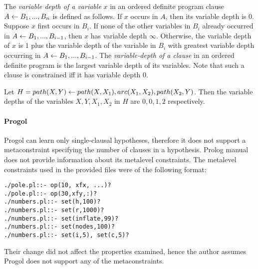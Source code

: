 \begin{defn}\label{definition_variable_depth}\cite{nienhuys1997foundations}
The \emph{variable depth of a variable} $x$ in an ordered definite program clause
$A \leftarrow  B_1, . . . , B_n$ is defined as follows. If $x$ occurs in $A$, then its variable depth is $0$. Suppose $x$ first occurs in $B_i$.
If none of the other variables
in $B_i$ already occurred in $A \leftarrow B_1,... ,B_{i-1}$,
then $x$ has variable depth $\infty$.
Otherwise, the variable depth of $x$ is $1$ plus the variable depth of the variable in $B_i$ with greatest variable depth occurring in
$A \leftarrow B_1,... ,B_{i-1}$.
The \emph{variable-depth of a clause} in an ordered definite program
is the largest variable depth of its variables. Note that such a
clause is constrained iff it has variable depth $0$.
\end{defn}

\begin{exmp}
Let $H=path(X,Y) \leftarrow path(X,X_1), arc(X_1,X_2), path(X_2,Y)$.
Then the variable depths of the variables $X,Y,X_1,X_2$ in $H$ are
$0,0,1,2$ respectively.
\end{exmp}

\paragraph{Progol}
Progol can learn only single-clausal hypotheses\cite{muggleton2012mc}, therefore it does not support a metaconstraint specifying the number of clauses in a hypothesis.
Prolog manual does not provide information about its metalevel constraints. The metalevel constraints used in the provided files\cite{muggleton1999progolWebsite} were of the following format:
\begin{lstlisting}
./pole.pl::- op(10, xfx, ...)?
./pole.pl::- op(30,xfy,:)?
./numbers.pl::- set(h,100)?
./numbers.pl::- set(r,1000)?
./numbers.pl::- set(inflate,99)?
./numbers.pl::- set(nodes,100)?
./numbers.pl::- set(i,5), set(c,5)?
\end{lstlisting}
Their change did not affect the properties examined, hence the author assumes Progol does not support any of the metaconstraints.

